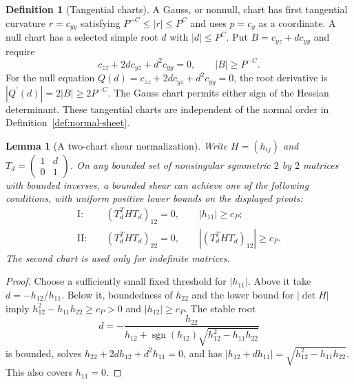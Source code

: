 \documentclass[11pt]{amsart}
\newtheorem{lemma}[theorem]{Lemma}
\theoremstyle{definition}
\newtheorem{definition}{Definition}[section]
\theoremstyle{remark}
\numberwithin{equation}{section}
\begin{document}
\begin{definition}[Tangential charts]\label{def:tangential-charts}
A Gauss, or nonnull, chart has first tangential curvature $r=c_{yy}$ satisfying $P^{-C}\le|r|\le P^C$ and uses $p=c_y$ as a coordinate. A null chart has a selected simple root $d$ with $|d|\le P^C$. Put $B=c_{yz}+dc_{yy}$ and require
\begin{equation}\label{geo:null-equation}
c_{zz}+2dc_{yz}+d^2c_{yy}=0,\qquad |B|\ge P^{-C}.
\end{equation}
For the null equation $Q(d)=c_{zz}+2dc_{yz}+d^2c_{yy}=0$, the root derivative is $|Q^\prime(d)|=2|B|\ge2P^{-C}$. The Gauss chart permits either sign of the Hessian determinant. These tangential charts are independent of the normal order in Definition~\ref{def:normal-sheet}.
\end{definition}
\begin{lemma}[A two-chart shear normalization]\label{geo:two-chart-shear}
Write $H=(h_{ij})$ and $T_d=\left(\begin{smallmatrix}1&d\\0&1\end{smallmatrix}\right)$. On any bounded set of nonsingular symmetric $2$ by $2$ matrices with bounded inverses, a bounded shear can achieve one of the following conditions, with uniform positive lower bounds on the displayed pivots:
\begin{align*}
\mathrm{I}:&\quad (T_d^THT_d)_{12}=0,\qquad |h_{11}|\ge c_P;\\
\mathrm{II}:&\quad (T_d^THT_d)_{22}=0,\qquad |(T_d^THT_d)_{12}|\ge c_P.
\end{align*}
The second chart is used only for indefinite matrices.
\end{lemma}
\begin{proof}
Choose a sufficiently small fixed threshold for $|h_{11}|$. Above it take $d=-h_{12}/h_{11}$. Below it, boundedness of $h_{22}$ and the lower bound for $|\det H|$ imply $h_{12}^2-h_{11}h_{22}\ge c_P>0$ and $|h_{12}|\ge c_P$. The stable root
\[
d=-\frac{h_{22}}{h_{12}+\operatorname{sgn}(h_{12})\sqrt{h_{12}^2-h_{11}h_{22}}}
\]
is bounded, solves $h_{22}+2dh_{12}+d^2h_{11}=0$, and has $|h_{12}+dh_{11}|=\sqrt{h_{12}^2-h_{11}h_{22}}$. This also covers $h_{11}=0$.
\end{proof}
\end{document}
